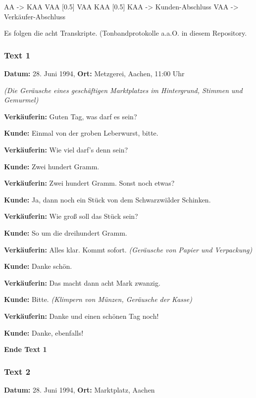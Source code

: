 \documentclass[
]{article}
\begin{document}
AA -\textgreater{} KAA VAA {[}0.5{]} \textbar{} VAA KAA {[}0.5{]} KAA
-\textgreater{} \textquotesingle Kunden-Abschluss\textquotesingle{} VAA
-\textgreater{} \textquotesingle Verkäufer-Abschluss\textquotesingle{}

Es folgen die acht Transkripte. (Tonbandprotokolle a.a.O. in diesem
Repository.

\subsubsection{\texorpdfstring{\textbf{Text 1}}{Text 1}}\label{text-1}

\textbf{Datum:} 28. Juni 1994, \textbf{Ort:} Metzgerei, Aachen, 11:00
Uhr

\emph{(Die Geräusche eines geschäftigen Marktplatzes im Hintergrund,
Stimmen und Gemurmel)}

\textbf{Verkäuferin:} Guten Tag, was darf es sein?

\textbf{Kunde:} Einmal von der groben Leberwurst, bitte.

\textbf{Verkäuferin:} Wie viel darf's denn sein?

\textbf{Kunde:} Zwei hundert Gramm.

\textbf{Verkäuferin:} Zwei hundert Gramm. Sonst noch etwas?

\textbf{Kunde:} Ja, dann noch ein Stück von dem Schwarzwälder Schinken.

\textbf{Verkäuferin:} Wie groß soll das Stück sein?

\textbf{Kunde:} So um die dreihundert Gramm.

\textbf{Verkäuferin:} Alles klar. Kommt sofort. \emph{(Geräusche von
Papier und Verpackung)}

\textbf{Kunde:} Danke schön.

\textbf{Verkäuferin:} Das macht dann acht Mark zwanzig.

\textbf{Kunde:} Bitte. \emph{(Klimpern von Münzen, Geräusche der Kasse)}

\textbf{Verkäuferin:} Danke und einen schönen Tag noch!

\textbf{Kunde:} Danke, ebenfalls!

\textbf{Ende Text 1}

\subsubsection{\texorpdfstring{\textbf{Text 2}}{Text 2}}\label{text-2}

\textbf{Datum:} 28. Juni 1994, \textbf{Ort:} Marktplatz, Aachen
\end{document}
